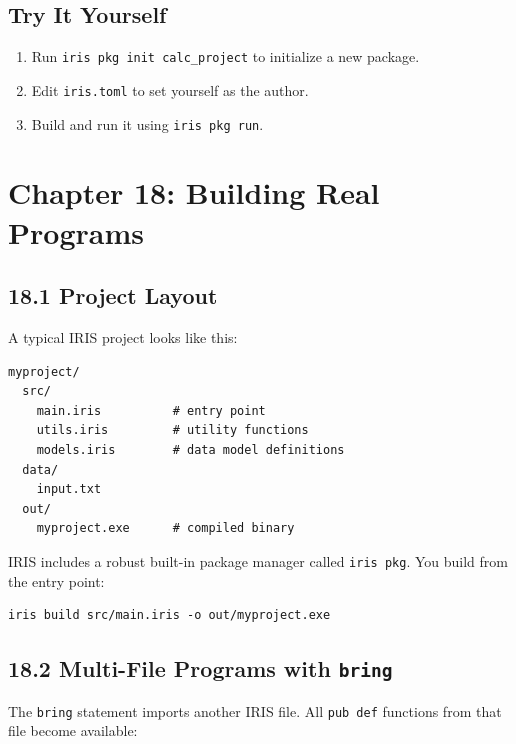 \documentclass[
  english,
]{book}
\providecommand{\tightlist}{%
  \setlength{\itemsep}{0pt}\setlength{\parskip}{0pt}}
\begin{document}
\subsection{Try It Yourself}\label{try-it-yourself-16}

\begin{enumerate}
\def\labelenumi{\arabic{enumi}.}
\tightlist
\item
  Run \texttt{iris\ pkg\ init\ calc\_project} to initialize a new
  package.
\item
  Edit \texttt{iris.toml} to set yourself as the author.
\item
  Build and run it using \texttt{iris\ pkg\ run}.
\end{enumerate}

\section{Chapter 18: Building Real
Programs}\label{chapter-18-building-real-programs}

\subsection{18.1 Project Layout}\label{project-layout}

A typical IRIS project looks like this:

\begin{verbatim}
myproject/
  src/
    main.iris          # entry point
    utils.iris         # utility functions
    models.iris        # data model definitions
  data/
    input.txt
  out/
    myproject.exe      # compiled binary
\end{verbatim}

IRIS includes a robust built-in package manager called
\texttt{iris\ pkg}. You build from the entry point:

\begin{verbatim}
iris build src/main.iris -o out/myproject.exe
\end{verbatim}

\subsection{\texorpdfstring{18.2 Multi-File Programs with
\texttt{bring}}{18.2 Multi-File Programs with bring}}\label{multi-file-programs-with-bring}

The \texttt{bring} statement imports another IRIS file. All
\texttt{pub\ def} functions from that file become available:
\end{document}
